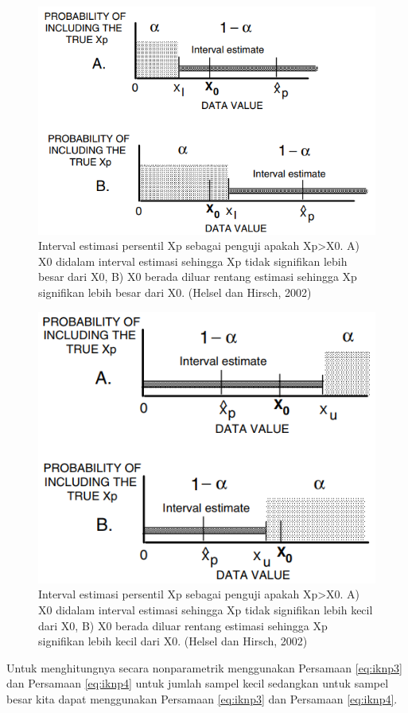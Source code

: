 \documentclass[]{book}
\begin{document}
\begin{figure}

{\centering \includegraphics[width=0.65\linewidth]{unup2} 

}

\caption{Interval estimasi persentil Xp sebagai penguji apakah Xp>X0. A) X0 didalam interval estimasi sehingga Xp tidak signifikan lebih besar dari X0, B) X0 berada diluar rentang estimasi sehingga Xp signifikan lebih besar dari X0. (Helsel dan Hirsch, 2002)}\label{fig:unup2}
\end{figure}

\begin{figure}

{\centering \includegraphics[width=0.65\linewidth]{unup3} 

}

\caption{Interval estimasi persentil Xp sebagai penguji apakah Xp>X0. A) X0 didalam interval estimasi sehingga Xp tidak signifikan lebih kecil dari X0, B) X0 berada diluar rentang estimasi sehingga Xp signifikan lebih kecil dari X0. (Helsel dan Hirsch, 2002)}\label{fig:unup3}
\end{figure}

Untuk menghitungnya secara nonparametrik menggunakan Persamaan
\eqref{eq:iknp3} dan Persamaan \eqref{eq:iknp4} untuk jumlah sampel kecil
sedangkan untuk sampel besar kita dapat menggunakan Persamaan
\eqref{eq:iknp3} dan Persamaan \eqref{eq:iknp4}.
\end{document}
